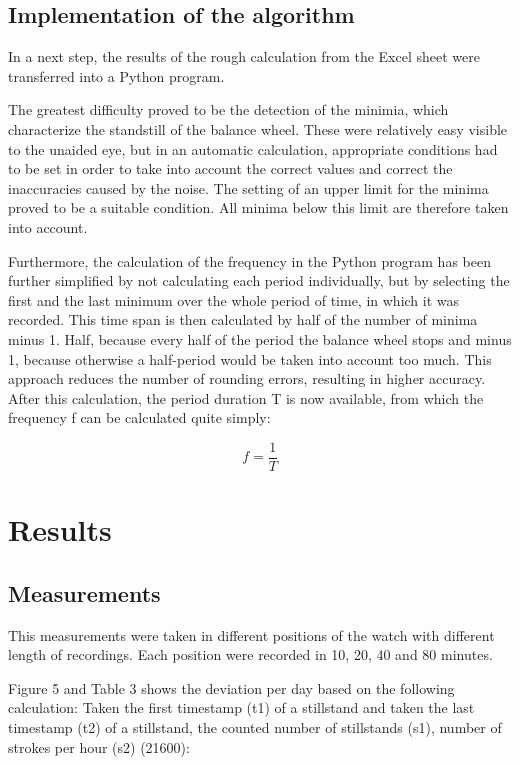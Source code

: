 \documentclass[12pt, a4paper]{report}
\begin{document}
\section{Implementation of the algorithm}

In a next step, the results of the rough calculation from the Excel sheet were transferred into a Python program. 

The greatest difficulty proved to be the detection of the minimia, which characterize the standstill of the balance wheel. These were relatively easy visible to the unaided eye, but in an automatic calculation, appropriate conditions had to be set in order to take into account the correct values and correct the inaccuracies caused by the noise. The setting of an upper limit for the minima proved to be a suitable condition. All minima below this limit are therefore taken into account. 

Furthermore, the calculation of the frequency in the Python program has been further simplified by not calculating each period individually, but by selecting the first and the last minimum over the whole period of time, in which it was recorded. This time span is then calculated by half of the number of minima minus 1. Half, because every half of the period the balance wheel stops and minus 1, because otherwise a half-period would be taken into account too much. This approach reduces the number of rounding errors, resulting in higher accuracy. After this calculation, the period duration T is now available, from which the frequency f can be calculated quite simply: 

 \begin{displaymath}
  f = \frac{1}{T}
 \end{displaymath}

\chapter{Results}

\section{Measurements}
This measurements were taken in different positions of the watch with different length
of recordings. Each position were recorded in 10, 20, 40 and 80 minutes.

Figure 5 and Table 3 shows the deviation per day based on the following calculation:
Taken the first timestamp (t1) of a stillstand and taken the last timestamp (t2) of a stillstand, the counted
number of stillstands (s1), number of strokes per hour (s2) (21600):
\bigskip
\end{document}
